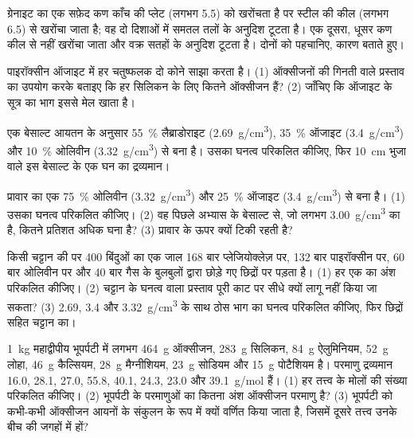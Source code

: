 \begin{exercise}[$\star\star$]\label{exo:g11:minerals:7}
ग्रेनाइट का एक सफ़ेद कण काँच की प्लेट (लगभग 5.5) को खरोंचता है पर
स्टील की कील (लगभग 6.5) से खरोंचा जाता है; वह दो दिशाओं में समतल तलों के अनुदिश
टूटता है। एक दूसरा, धूसर कण कील से नहीं खरोंचा जाता और
वक्र सतहों के अनुदिश टूटता है। दोनों को पहचानिए, कारण बताते हुए।
\end{exercise}

\begin{exercise}[$\star\star$]\label{exo:g11:minerals:8}
पाइरॉक्सीन ऑजाइट में हर चतुष्फलक दो कोने साझा करता है। (1)
ऑक्सीजनों की गिनती वाले प्रस्ताव का उपयोग करके बताइए कि हर सिलिकन के लिए कितने ऑक्सीजन
हैं? (2) जाँचिए कि ऑजाइट के सूत्र का भाग 
इससे मेल खाता है।
\end{exercise}

\begin{exercise}[$\star\star$]\label{exo:g11:minerals:9}
एक बेसाल्ट आयतन के अनुसार \qty{55}{\percent} लैब्राडोराइट (\qty{2.69}{g/cm^3}),
\qty{35}{\percent} ऑजाइट (\qty{3.4}{g/cm^3}) और \qty{10}{\percent} ओलिवीन
(\qty{3.32}{g/cm^3}) से बना है। उसका घनत्व परिकलित कीजिए, फिर
\qty{10}{cm} भुजा वाले इस बेसाल्ट के एक घन का द्रव्यमान।
\end{exercise}

\begin{exercise}[$\star\star$]\label{exo:g11:minerals:10}
प्रावार का एक  \qty{75}{\percent} ओलिवीन
(\qty{3.32}{g/cm^3}) और \qty{25}{\percent} ऑजाइट (\qty{3.4}{g/cm^3}) से बना है।
(1) उसका घनत्व परिकलित कीजिए। (2) वह पिछले अभ्यास के बेसाल्ट से,
जो लगभग \qty{3.00}{g/cm^3} का है, कितने प्रतिशत अधिक घना है? (3)
 प्रावार के ऊपर क्यों टिकी रहती है?
\end{exercise}

\begin{exercise}[$\star\star$]\label{exo:g11:minerals:11}
किसी चट्टान की  पर 400 बिंदुओं का एक जाल 168 बार
प्लेजियोक्लेज़ पर, 132 बार पाइरॉक्सीन पर, 60 बार ओलिवीन पर और 40 बार
गैस के बुलबुलों द्वारा छोड़े गए छिद्रों पर पड़ता है। (1) हर एक का अंश परिकलित कीजिए। (2)
चट्टान के घनत्व वाला प्रस्ताव पूरी काट पर सीधे क्यों लागू नहीं किया जा
सकता? (3) \qty{2.69}{},
\qty{3.4}{} और \qty{3.32}{g/cm^3} के साथ ठोस भाग का घनत्व परिकलित कीजिए, फिर छिद्रों सहित चट्टान का।
\end{exercise}

\begin{exercise}[$\star\star\star$]\label{exo:g11:minerals:12}
\qty{1}{kg} महाद्वीपीय भूपर्पटी में लगभग \qty{464}{g} ऑक्सीजन,
\qty{283}{g} सिलिकन, \qty{84}{g} ऐलुमिनियम, \qty{52}{g} लोहा,
\qty{46}{g} कैल्सियम, \qty{28}{g} मैग्नीशियम, \qty{23}{g} सोडियम और
\qty{15}{g} पोटैशियम है। परमाणु द्रव्यमान \qty{16.0}{},
\qty{28.1}{}, \qty{27.0}{}, \qty{55.8}{}, \qty{40.1}{}, \qty{24.3}{}, \qty{23.0}{} और
\qty{39.1}{g/mol} हैं। (1) हर तत्त्व के मोलों की संख्या परिकलित कीजिए। (2)
भूपर्पटी के परमाणुओं का कितना अंश ऑक्सीजन परमाणु है? (3) भूपर्पटी को
कभी-कभी ऑक्सीजन आयनों के संकुलन के रूप में क्यों वर्णित किया जाता है, जिसमें दूसरे तत्त्व
उनके बीच की जगहों में हों?
\end{exercise}


